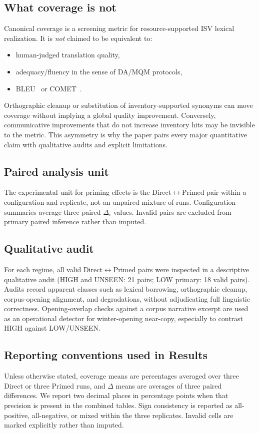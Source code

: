 \subsection{What coverage is not}
Canonical coverage is a screening metric for resource-supported ISV lexical realization.
It is \emph{not} claimed to be equivalent to:
\begin{itemize}[leftmargin=*]
  \item human-judged translation quality,
  \item adequacy/fluency in the sense of DA/MQM protocols,
  \item BLEU~\citep{papineni-etal-2002-bleu} or COMET~\citep{rei-etal-2020-comet}.
\end{itemize}
Orthographic cleanup or substitution of inventory-supported synonyms can move coverage without implying a global quality improvement.
Conversely, communicative improvements that do not increase inventory hits may be invisible to the metric.
This asymmetry is why the paper pairs every major quantitative claim with qualitative audits and explicit limitations.

\subsection{Paired analysis unit}
The experimental unit for priming effects is the Direct$\leftrightarrow$Primed pair within a configuration and replicate, not an unpaired mixture of runs.
Configuration summaries average three paired $\Delta_i$ values.
Invalid pairs are excluded from primary paired inference rather than imputed.

\subsection{Qualitative audit}
For each regime, all valid Direct$\leftrightarrow$Primed pairs were inspected in a descriptive qualitative audit (HIGH and UNSEEN: 21 pairs; LOW primary: 18 valid pairs).
Audits record apparent classes such as lexical borrowing, orthographic cleanup, corpus-opening alignment, and degradations, without adjudicating full linguistic correctness.
Opening-overlap checks against a corpus narrative excerpt are used as an operational detector for winter-opening near-copy, especially to contrast HIGH against LOW/UNSEEN.

\subsection{Reporting conventions used in Results}
Unless otherwise stated, coverage means are percentages averaged over three Direct or three Primed runs, and $\Delta$ means are averages of three paired differences.
We report two decimal places in percentage points when that precision is present in the combined tables.
Sign consistency is reported as all-positive, all-negative, or mixed within the three replicates.
Invalid cells are marked explicitly rather than imputed.
